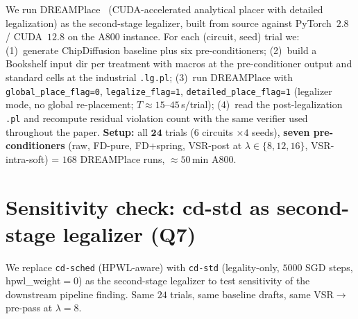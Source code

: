 \documentclass{article}
\begin{document}
We run DREAMPlace~\cite{dreamplace} (CUDA-accelerated analytical
placer with detailed legalization) as the second-stage legalizer,
built from source against PyTorch~$2.8$ / CUDA~$12.8$ on the A800
instance.  For each (circuit, seed) trial we:
(1)~generate ChipDiffusion baseline plus six pre-conditioners;
(2)~build a Bookshelf input dir per treatment with macros at the
pre-conditioner output and standard cells at the industrial
\texttt{.lg.pl}; (3)~run DREAMPlace with \texttt{global\_place\_flag=0},
\texttt{legalize\_flag=1}, \texttt{detailed\_place\_flag=1} (legalizer
mode, no global re-placement; $T{\approx}15$--$45$\,s/trial); (4)~read
the post-legalization \texttt{.pl} and recompute residual violation
count with the same verifier used throughout the paper.
\textbf{Setup:} all $\mathbf{24}$ trials ($6$ circuits $\times 4$
seeds), \textbf{seven pre-conditioners} (raw, FD-pure, FD+spring,
VSR-post at $\lambda{\in}\{8, 12, 16\}$, VSR-intra-soft) =
$168$ DREAMPlace runs, $\approx 50$\,min A800.

\begin{table}[h]
\centering
\scriptsize
\setlength{\tabcolsep}{3pt}
\resizebox{\linewidth}{!}{}
\caption{External legalizer pipeline.  All $24$ trials, $7$
pre-conditioners.  All force-directed pre-conditioners (FD-pure,
FD+spring, VSR-post at every $\lambda$) halve the median residual
relative to raw ($\sim 9.5$--$10.4$k vs.\ $20$k);
VSR-intra-soft does not help ($\sim 20$k, $p_v{=}1.0$ vs.\ raw).
Among force-directed pre-conditioners, none is significantly better
than another (VSR$_{\lambda=8}$ vs.\ FD-pure $p_v{=}0.22$).
\textbf{Full legality is $0/24$ under every pre-conditioner};
$\mathbf{0/168}$ method-trials ever reach $v{=}0$.  Macros-only HPWL
is not comparable post-DREAMPlace (DREAMPlace optimises full-design
density+wirelength on its own objective).}
\label{tab:supp-dp-pipeline}
\end{table}

\section{Sensitivity check: cd-std as second-stage legalizer (Q7)}
\label{sec:supp-cdstd-pipeline}

We replace \texttt{cd-sched} (HPWL-aware) with \texttt{cd-std}
(legality-only, $5000$ SGD steps, hpwl\_weight$=0$) as the second-stage
legalizer to test sensitivity of the downstream pipeline finding.  Same
$24$ trials, same baseline drafts, same VSR$\to$ pre-pass at
$\lambda{=}8$.
\end{document}
